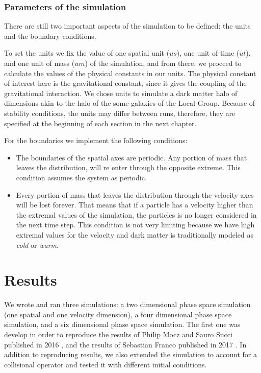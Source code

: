 \subsection{Parameters of the simulation}
There are still two important aspects of the simulation to be defined: the units and the boundary conditions.

To set the units we fix the value of one spatial unit ($us$), one unit of time ($ut$), and one unit of mass ($um$) of the simulation, and from there, we proceed to calculate the values of the physical constants in our units.
The physical constant of interest here is the gravitational constant, since it gives the coupling of the gravitational interaction.
We chose units to simulate a dark matter halo of dimensions akin to the halo of the some galaxies of the Local Group. Because of stability conditions, the units may differ between runs, therefore, they are specified at the beginning of each section in the next chapter.

For the boundaries we implement the following conditions:
\begin{itemize}
\item The boundaries of the spatial axes are periodic. Any portion of mass that leaves the distribution, will re enter through the opposite extreme. This condition assumes the system as periodic.
\item Every portion of mass that leaves the distribution through the velocity axes will be lost forever. That means that if a particle has a velocity higher than the extremal values of the simulation, the particles is no longer considered in the next time step. This condition is not very limiting because we have high extremal values for the velocity and dark matter is traditionally modeled as \emph{cold} or \emph{warm}.
\end{itemize}


\chapter{Results}
We wrote and ran three simulations: a  two dimensional phase space simulation (one spatial and one velocity dimension), a four dimensional phase space simulation, and a six dimensional phase space simulation. 
The first one was develop in order to reproduce the results of Philip Mocz and Sauro Succi published in 2016 \cite{integerLatticeDynamics}, and the results of Sebastian Franco published in 2017 \cite{franco}.
In addition to reproducing results, we also extended the simulation to account for a collisional operator and tested it with different initial conditions.

